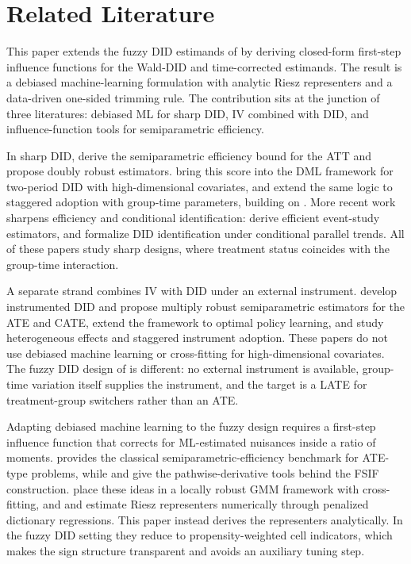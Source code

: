 \section{Related Literature}\label{sec:lit}

This paper extends the fuzzy DID estimands of \cite{fuzzy2018} by deriving closed-form first-step influence functions for the Wald-DID and time-corrected estimands. The result is a debiased machine-learning formulation with analytic Riesz representers and a data-driven one-sided trimming rule. The contribution sits at the junction of three literatures: debiased ML for sharp DID, IV combined with DID, and influence-function tools for semiparametric efficiency.

In sharp DID, \cite{sant2020doubly} derive the semiparametric efficiency bound for the ATT and propose doubly robust estimators. \cite{chang2020double} bring this score into the DML framework for two-period DID with high-dimensional covariates, and \cite{callaway2023ddml} extend the same logic to staggered adoption with group-time parameters, building on \cite{callaway2021did}. More recent work sharpens efficiency and conditional identification: \cite{chen2025efficient} derive efficient event-study estimators, and \cite{caetano2024did} formalize DID identification under conditional parallel trends. All of these papers study sharp designs, where treatment status coincides with the group-time interaction.

A separate strand combines IV with DID under an external instrument. \cite{ye2023instrumented} develop instrumented DID and propose multiply robust semiparametric estimators for the ATE and CATE, \cite{zhao2025semiparametric} extend the framework to optimal policy learning, and \cite{miyaji2024instrumented} study heterogeneous effects and staggered instrument adoption. These papers do not use debiased machine learning or cross-fitting for high-dimensional covariates. The fuzzy DID design of \cite{fuzzy2018} is different: no external instrument is available, group-time variation itself supplies the instrument, and the target is a LATE for treatment-group switchers rather than an ATE.

Adapting debiased machine learning to the fuzzy design requires a first-step influence function that corrects for ML-estimated nuisances inside a ratio of moments. \cite{hahn1998} provides the classical semiparametric-efficiency benchmark for ATE-type problems, while \cite{newey1994asymptotic} and \cite{ichimura2022influence} give the pathwise-derivative tools behind the FSIF construction. \cite{chernozhukov2022locally} place these ideas in a locally robust GMM framework with cross-fitting, and \cite{CNS2022} and \cite{escanciano2023automatic} estimate Riesz representers numerically through penalized dictionary regressions. This paper instead derives the representers analytically. In the fuzzy DID setting they reduce to propensity-weighted cell indicators, which makes the sign structure transparent and avoids an auxiliary tuning step.
